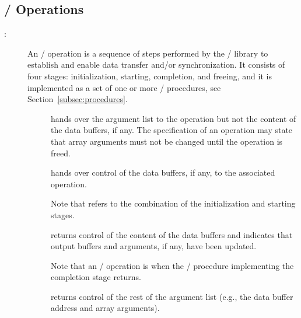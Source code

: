 \subsection{\texorpdfstring{\MPI/}{MPI} Operations}
\label{subsec:operations}
\begin{description}
\item[:]
An \MPI/ operation is a sequence of steps performed by the \MPI/
library to establish and enable data transfer and/or synchronization.
It consists of four stages:
initialization, starting, completion, and freeing, and it is implemented
as a set of one or more \MPI/ procedures,
see Section~\ref{subsec:procedures}.

\begin{description}
\item[] hands over the
  argument list to the operation but not the content of the data
  buffers, if any.  The specification of an operation may state that
  array arguments must not be changed until the operation is freed.

\item[] hands over control of
  the data buffers, if any, to the associated operation.

Note that  refers to the combination of the
initialization and starting stages.

\item[] returns control of the
  content of the data buffers and indicates that output buffers and
  arguments, if any, have been updated.

  Note that an \MPI/ operation is
   when the \MPI/
  procedure implementing the completion stage returns.

\item[] returns control of the rest
  of the argument list (e.g., the data buffer address and array
  arguments).
\end{description}


\end{description}
